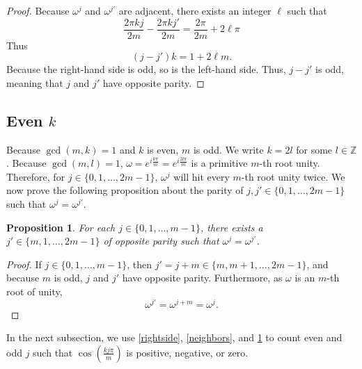 \documentclass{amsart}
\renewcommand{\Re}{\operatorname{Re}}
\newtheorem{proposition}{Proposition}
\theoremstyle{definition}
\theoremstyle{remark}
\begin{document}
    \begin{proof}
    Because $\omega^{j}$ and $\omega^{j'}$ are adjacent, there exists an integer $\ell$ such that
    \[
    \frac{2\pi{kj}}{2m} - \frac{2\pi{kj'}}{2m} = \frac{2\pi}{2m} + 2 \ell \pi
    \]
    Thus
    \[
    (j-j')k=1+2\ell m. 
    \]
    Because the right-hand side is odd, so is the left-hand side. Thus, $j-j'$ is odd, meaning that $j$ and $j'$ have opposite parity. 
    \end{proof}

\subsection{Even $k$}

Because $\gcd(m,k)=1$ and $k$ is even, $m$ is odd.  We write $k = 2l$ for some $l \in \mathbb{Z}$. 
Because $\gcd(m,l) = 1$, $\omega =e^{i\frac{k \pi}{m}} =  e^{i\frac{2 l \pi }{m}}$ is a primitive $m$-th root unity. Therefore, for $j \in \{0,1,\dots,  2m-1\}$, $\omega^j$ will hit every $m$-th root unity twice. We now prove the following proposition about the parity of $j,j' \in \{0,1,\dots,  2m-1\}$ such that $\omega^j = \omega^{j'}$.

\begin{proposition}\label{buddies}
For each $j \in \{0,1, \dots,  m-1\}$, there exists a $j' \in \{m,1, \dots,  2m-1\}$ of opposite parity such that $\omega^j = \omega^{j'}$.
\end{proposition}

\begin{proof} If $j \in \{0,1,\dots,  m-1\}$, then $j' = j + m \in \{m,m+1, \dots,  2m-1\}$, and because $m$ is odd, $j$ and $j'$ have opposite parity. Furthermore, as $\omega$ is an $m$-th root of unity, 
\[
\omega^{j'} = \omega^{j+m}=\omega^j. 
\]
\end{proof}
    
In the next subsection, we use \ref{rightside}, \ref{neighbors}, and \ref{buddies} to count even and odd $j$ such that $\cos({\frac{kj\pi}{m}})$ is positive, negative, or zero.

\end{document}
